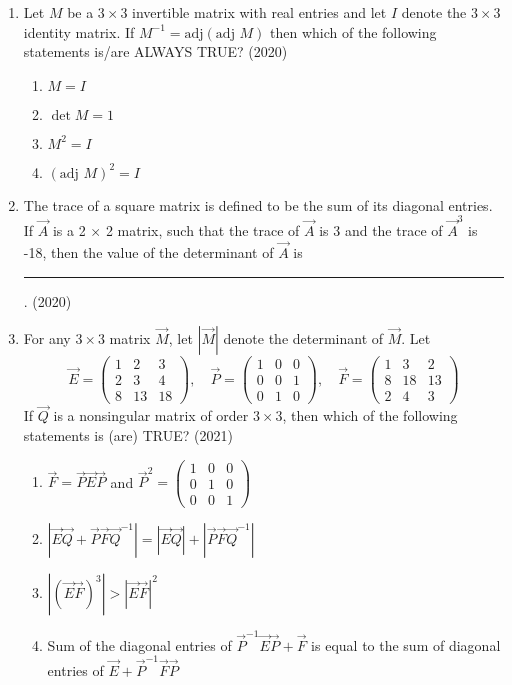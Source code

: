 \begin{enumerate}[label=\thesubsection.\arabic*.,ref=\thesubsection.\theenumi]
\item   Let $M$ be a $3 \times 3$ invertible matrix with real entries and let $I$ denote the $3 \times 3$ identity matrix. If $ M^{-1} = \text{adj}(\text{adj } M)$ then which of the following statements is/are ALWAYS TRUE?
		\hfill(2020)
\begin{multicols}{4}
    \begin{enumerate}
        \item  $M = I$
        \item  $\det M = 1$
        \item  $M^2 = I$
        \item  $(\text{adj } M)^2 = I$
    \end{enumerate}
\end{multicols}
%
\item The trace of a square matrix is defined to be the sum of its diagonal entries. If $\vec{A}$ is a 2 $\times$ 2 matrix, such that the trace of $\vec{A}$ is 3 and the trace of $\vec{A}^3$ is -18, then the value of the determinant of $\vec{A}$ is \rule{1cm}{0.1pt}.
\hfill (2020)
%
    \item For any $3 \times 3$ matrix $\vec{M}$, let $|\vec{M}|$ denote the determinant of $\vec{M}$. Let  
    \[
    \vec{E} = \begin{pmatrix} 1 & 2 & 3 \\ 2 & 3 & 4 \\ 8 & 13 & 18 \end{pmatrix}, \quad \vec{P} = \begin{pmatrix} 1 & 0 & 0 \\ 0 & 0 & 1 \\ 0 & 1 & 0 \end{pmatrix}, \quad \vec{F} = \begin{pmatrix} 1 & 3 & 2 \\ 8 & 18 & 13 \\ 2 & 4 & 3 \end{pmatrix}
    \]  
    If $\vec{Q}$ is a nonsingular matrix of order $3 \times 3$, then which of the following statements is (are) TRUE?  
    \hfill (2021)
\begin{enumerate}
         \item  $\vec{F} = \vec{P}\vec{E}\vec{P}$ and $\vec{P}^2 = \begin{pmatrix} 1 & 0 & 0 \\ 0 & 1 & 0 \\ 0 & 0 & 1 \end{pmatrix}$  
         \item  $|\vec{E}\vec{Q} + \vec{P}\vec{F}\vec{Q}^{-1}| = |\vec{E}\vec{Q}| + |\vec{P}\vec{F}\vec{Q}^{-1}|$  
         \item  $|(\vec{E}\vec{F})^3| > |\vec{E}\vec{F}|^2$  
         \item  Sum of the diagonal entries of $\vec{P}^{-1}\vec{E}\vec{P} +\vec{F}$ is equal to the sum of diagonal entries of $\vec{E} + \vec{P}^{-1}\vec{F}\vec{P}$
    \end{enumerate}


\end{enumerate}
